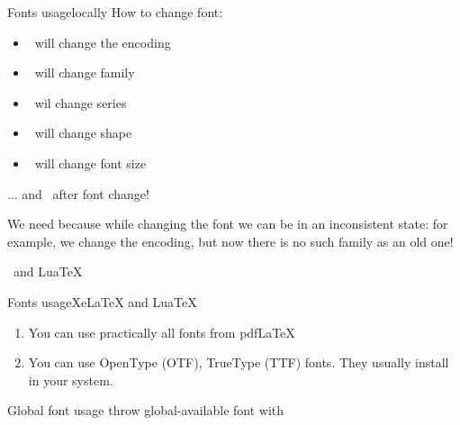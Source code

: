 \begin{frame}[t, fragile]{Fonts usage\magicPage}{locally}\relax
    How to change font:
    \begin{itemize}
        \item \ccol\fontencoding\ will change the encoding
        \item \ccol\fontfamily\ will change family
        \item \ccol\fontseries\ wil change series 
        \item \ccol\fontshape\ will change shape 
        \item \ccol\fontsize\ will change font size 
    \end{itemize}
    ... and {\large \ccol\selectfont}\ after font change!
    
    We need \ccol{\selectfont} because while changing the font we can be in an inconsistent state: for example, we change the encoding, but now there is no such family as an old one!
    
\end{frame}

\begin{frame}

    \magicPage
     \centering\Huge \XeLaTeX\ and Lua\TeX
     
\end{frame}

\begin{frame}{Fonts usage\magicPage}{XeLaTeX and LuaTeX}\relax
     \begin{enumerate}
         \item You can use practically all fonts from pdf\LaTeX
         \item You can use OpenType (OTF), TrueType (TTF) fonts. They usually install in your system.
          
     \end{enumerate}
\end{frame}

\begin{frame}

    \magicPage
     \centering\huge Global font usage throw global-available font with \XeLaTeX
     
\end{frame}

